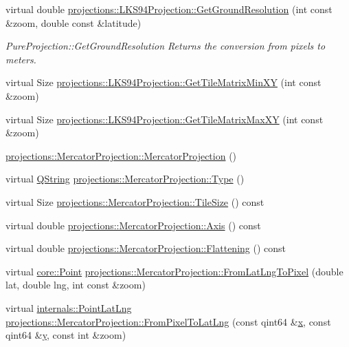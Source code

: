 \begin{DoxyCompactItemize}
\item 
virtual double \hyperlink{group___o_p_map_widget_ga8ec3073798d3fd7b19d1e62aac216fd7}{projections\-::\-L\-K\-S94\-Projection\-::\-Get\-Ground\-Resolution} (int const \&zoom, double const \&latitude)
\begin{DoxyCompactList}\small\item\em \-Pure\-Projection\-::\-Get\-Ground\-Resolution \-Returns the conversion from pixels to meters. \end{DoxyCompactList}\item 
virtual \-Size \hyperlink{group___o_p_map_widget_ga86d31a1ce953b8c93d0ee6b7dd4d7db6}{projections\-::\-L\-K\-S94\-Projection\-::\-Get\-Tile\-Matrix\-Min\-X\-Y} (int const \&zoom)
\item 
virtual \-Size \hyperlink{group___o_p_map_widget_gaa838d53afb098ce93a50200bf0f79dec}{projections\-::\-L\-K\-S94\-Projection\-::\-Get\-Tile\-Matrix\-Max\-X\-Y} (int const \&zoom)
\item 
\hyperlink{group___o_p_map_widget_gacccd26328cbdd182922e0a0b2e265529}{projections\-::\-Mercator\-Projection\-::\-Mercator\-Projection} ()
\item 
virtual \hyperlink{group___u_a_v_objects_plugin_gab9d252f49c333c94a72f97ce3105a32d}{\-Q\-String} \hyperlink{group___o_p_map_widget_gaefd6d064dd9c4c6cfc431ead163f706a}{projections\-::\-Mercator\-Projection\-::\-Type} ()
\item 
virtual \-Size \hyperlink{group___o_p_map_widget_gab8dee05993ebd618b81c24cb3548076a}{projections\-::\-Mercator\-Projection\-::\-Tile\-Size} () const 
\item 
virtual double \hyperlink{group___o_p_map_widget_ga982d1100874717420bf3ab65e74c9c9d}{projections\-::\-Mercator\-Projection\-::\-Axis} () const 
\item 
virtual double \hyperlink{group___o_p_map_widget_ga85c35978f6b64944591d25a095fc8e4d}{projections\-::\-Mercator\-Projection\-::\-Flattening} () const 
\item 
virtual \hyperlink{structcore_1_1_point}{core\-::\-Point} \hyperlink{group___o_p_map_widget_ga4e5e9d139c245de8a1278e83746ed240}{projections\-::\-Mercator\-Projection\-::\-From\-Lat\-Lng\-To\-Pixel} (double lat, double lng, int const \&zoom)
\item 
virtual \hyperlink{structinternals_1_1_point_lat_lng}{internals\-::\-Point\-Lat\-Lng} \hyperlink{group___o_p_map_widget_gaaa80928cf51f4c3a7e860678a7bf51ee}{projections\-::\-Mercator\-Projection\-::\-From\-Pixel\-To\-Lat\-Lng} (const qint64 \&\hyperlink{_o_p_plots_8m_a9336ebf25087d91c818ee6e9ec29f8c1}{x}, const qint64 \&\hyperlink{_o_p_plots_8m_a2fb1c5cf58867b5bbc9a1b145a86f3a0}{y}, const int \&zoom)

\end{DoxyCompactItemize}
